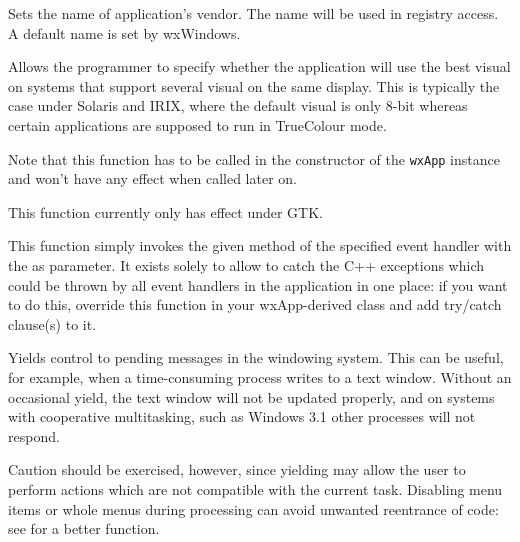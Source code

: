 Sets the name of application's vendor. The name will be used
in registry access. A default name is set by
wxWindows.




\label{wxappsetusebestvisual}


Allows the programmer to specify whether the application will use the best visual
on systems that support several visual on the same display. This is typically the
case under Solaris and IRIX, where the default visual is only 8-bit whereas certain
applications are supposed to run in TrueColour mode.

Note that this function has to be called in the constructor of the {\tt wxApp} 
instance and won't have any effect when called later on.

This function currently only has effect under GTK.




\label{wxapphandleevent}


This function simply invokes the given method  of the specified
event handler  with the  as parameter. It exists solely
to allow to catch the C++ exceptions which could be thrown by all event
handlers in the application in one place: if you want to do this, override this
function in your wxApp-derived class and add try/catch clause(s) to it.


\label{wxappyield}


Yields control to pending messages in the windowing system. This can be useful, for example, when a
time-consuming process writes to a text window. Without an occasional
yield, the text window will not be updated properly, and on systems with
cooperative multitasking, such as Windows 3.1 other processes will not respond.

Caution should be exercised, however, since yielding may allow the
user to perform actions which are not compatible with the current task.
Disabling menu items or whole menus during processing can avoid unwanted
reentrance of code: see  for a better
function.

